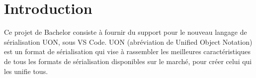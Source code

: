 \documentclass[
    iict, %
    il, %
]{heig-tb}
\begin{document}
\maketitle
\frontmatter
\clearemptydoublepage

\preamble
\let\cleardoublepage\clearpage
\authentification
\let\cleardoublepage\clearpage

\begin{abstract}
    
\end{abstract}

\listoffigures
{}
\listoflistings
{}

\tableofcontents

\printnomenclature
\clearemptydoublepage
{}

\pagestyle{fancy}
\fancyhf{}
\renewcommand\headrulewidth{1pt}

\fancyhead[L]{\itshape\nouppercase{\leftmark}}

\renewcommand{\chaptermark}[1]{\markboth{\MakeUppercase{#1}}{}}

\renewcommand\footrulewidth{1pt}


\renewcommand{\headrulewidth}{0.4pt}
\renewcommand{\footrulewidth}{0.4pt}

\titlespacing*{\chapter}{0pt}{-40pt}{20pt}

\mainmatter
\chapter{Introduction}


Ce projet de Bachelor consiste à fournir du support pour le nouveau langage de sérialisation UON, sous VS Code.
UON (abréviation de Unified Object Notation) est un format de sérialisation qui vise à rassembler les meilleures caractéristiques de tous les formats de sérialisation disponibles sur le marché, pour créer celui qui les unifie tous.
\end{document}
